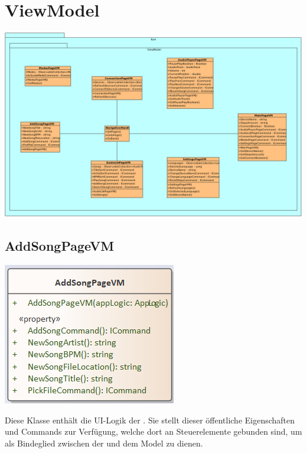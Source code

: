 \documentclass[../entwurf.tex]{subfiles}
\begin{document}
\section{ViewModel}
\includegraphics[scale=0.3]{../graphics/uml_diagramme/ViewModelDiagram.png}
\subsection{AddSongPageVM}
\begin{minipage}{0.45\textwidth}
\includegraphics[scale=0.75]{../graphics/vm_klassen/AddSongPageVM.png}
\end{minipage}
\begin{minipage}{0.55\textwidth}
Diese Klasse enthält die UI-Logik der . Sie stellt dieser öffentliche Eigenschaften und Commands zur Verfügung, welche dort an Steuerelemente gebunden sind, um als Bindeglied zwischen der  und dem Model zu dienen.
\end{minipage}
\end{document}

